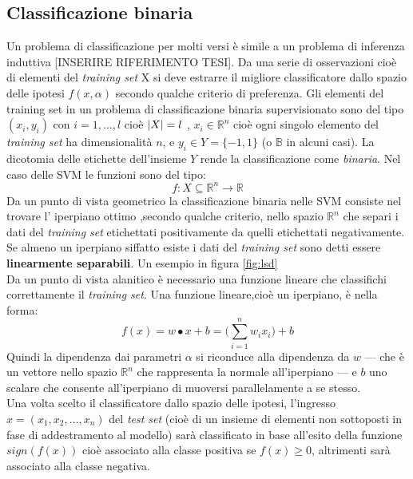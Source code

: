 \subsection{Classificazione binaria}
\label{sub:clb}
Un problema di classificazione per molti versi è simile a un problema di inferenza induttiva [INSERIRE RIFERIMENTO TESI]. Da una serie di osservazioni cioè di elementi del \textit{training set} X si deve estrarre il migliore classificatore dallo spazio delle ipotesi $f(x,\alpha)$ secondo qualche criterio di preferenza. Gli elementi del training set in un problema di classificazione binaria supervisionato sono del tipo $(x_i , y_i)$ con $i=1,\dots,l$ cioè $\lvert X\rvert=l$ , $x_i \in \mathbb{R}^{n}$ cioè ogni singolo elemento del \textit{training set} ha dimensionalità $n$, e $y_i \in Y=\{-1,1\}$ (o $\mathbb{B}$ in alcuni casi). La dicotomia delle etichette dell'insieme $Y$ rende la classificazione come \textit{binaria}.
 Nel caso delle \ac{SVM} le funzioni sono del tipo:
\begin{equation*}
f : X \subseteq \mathbb{R}^{n} \to \mathbb{R}
\end{equation*}
Da un punto di vista geometrico la classificazione binaria nelle \ac{SVM} consiste nel trovare l' iperpiano ottimo ,secondo qualche criterio, nello spazio $\mathbb{R}^n$  che separi i dati del \textit{training set} etichettati positivamente da quelli etichettati negativamente. Se almeno un iperpiano siffatto esiste i dati del \textit{training set} sono detti essere \textbf{linearmente separabili}. Un esempio in figura \ref{fig:lsd}\\
Da un punto di vista alanitico è necessario una funzione lineare che classifichi correttamente il \textit{training set}. Una funzione lineare,cioè un iperpiano,  è nella forma:
\begin{equation*}
f(x) = w \bullet x +b = \Biggl(\sum_{i=1}^{n}w_{i}x_{i}\Biggl) + b
\end{equation*}
Quindi la dipendenza dai parametri $\alpha$ si riconduce alla dipendenza da $w$ --- che è un vettore nello spazio $\mathbb{R}^n$ che rappresenta la normale all'iperpiano --- e $b$ uno scalare che consente all'iperpiano di muoversi parallelamente a se stesso.\\  
Una volta scelto il classificatore dallo spazio delle ipotesi, l'ingresso $x=(x_1,x_2,\dots,x_n) $ del \textit{test set} (cioè di un insieme di elementi non sottoposti in fase di addestramento al modello) sarà classificato in base all'esito della funzione $sign(f(x))$ cioè associato alla classe positiva se $f(x) \geq 0$, altrimenti sarà associato alla classe negativa.
 
